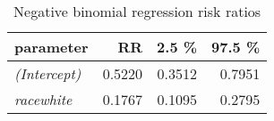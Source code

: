 \begin{wraptable}{r}{3in}

\caption{\label{tab:neg_bin_reg_RR}Negative binomial regression risk ratios}
\centering
\fontsize{9}{11}\selectfont
\begin{tabular}[t]{>{}lrrr}
\toprule
parameter & RR & 2.5 \% & 97.5 \%\\
\midrule
\em{(Intercept)} & 0.5220 & 0.3512 & 0.7951\\
\em{racewhite} & 0.1767 & 0.1095 & 0.2795\\
\bottomrule
\end{tabular}
\end{wraptable}
